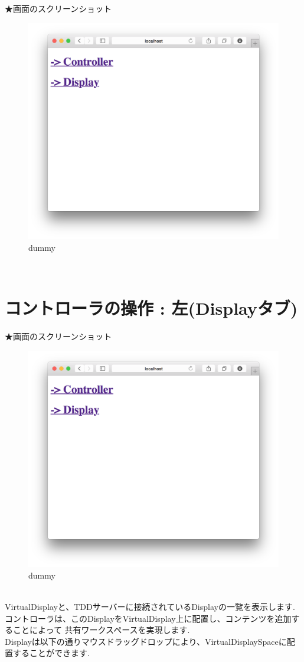 \documentclass[a4paper,10pt,oneside]{jsbook}
\begin{document}
★画面のスクリーンショット
\begin{figure}[htbp]
	\begin{center}
		\includegraphics[width=11.5cm]{image/home.png}
	\end{center}
	\caption{dummy}
	\label{fig:home}
\end{figure}
\\


\newpage

\section{コントローラの操作 : 左(Displayタブ)}
★画面のスクリーンショット
\begin{figure}[htbp]
	\begin{center}
		\includegraphics[width=11.5cm]{image/home.png}
	\end{center}
	\caption{dummy}
	\label{fig:home}
\end{figure}
\\
VirtualDisplayと、TDDサーバーに接続されているDisplayの一覧を表示します.\\
コントローラは、このDisplayをVirtualDisplay上に配置し、コンテンツを追加することによって
共有ワークスペースを実現します.\\
Displayは以下の通りマウスドラッグドロップにより、VirtualDisplaySpaceに配置することができます.\\
\end{document}
